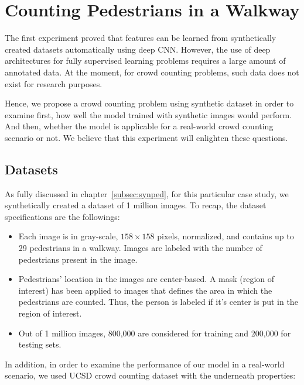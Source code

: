 \section{Counting Pedestrians in a Walkway}

The first experiment proved that features can be learned from synthetically created datasets automatically using deep CNN. However, the use of deep architectures for fully supervised learning problems requires a large amount of annotated data. At the moment, for crowd counting problems, such data does not exist for research purposes. 

Hence, we propose a crowd counting problem using synthetic dataset in order to examine first, how well the model trained with synthetic images would perform. And then, whether the model is applicable for a real-world crowd counting scenario or not. We believe that this experiment will enlighten these questions. 

\subsection{Datasets} 

As fully discussed in chapter~\ref{subsec:synped}, for this particular case study, we synthetically created a dataset of 1 million images. To recap, the dataset specifications are the followings:
\begin{itemize}
\item Each image is in gray-scale, $158\times158$ pixels, normalized, and contains up to 29 pedestrians in a walkway. Images are labeled with the number of pedestrians present in the image.  
\item Pedestrians' location in the images are center-based. A mask (region of interest) has been applied to images that defines the area in which the pedestrians are counted. Thus, the person is labeled if it's center is put in the region of interest.   
\item Out of 1 million images, 800,000 are considered for training and 200,000 for testing sets.
\end{itemize} 

\noindent In addition, in order to examine the performance of our model in a real-world scenario, we used UCSD crowd counting dataset \cite{chan2008privacy} with the underneath properties:


